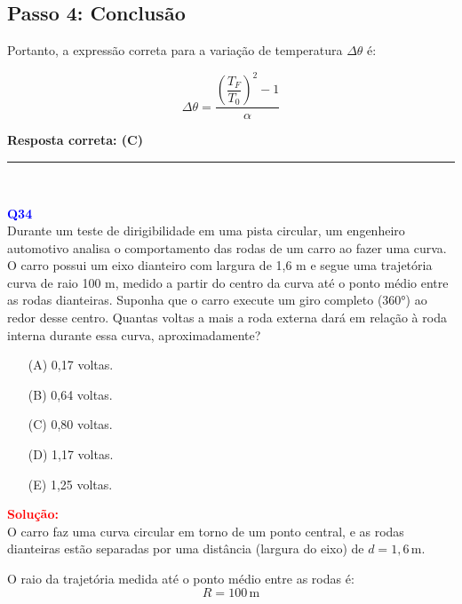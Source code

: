 \documentclass[a4paper,12pt]{article}
\begin{document}
\begin{flushleft}
\subsection*{Passo 4: Conclusão}

Portanto, a expressão correta para a variação de temperatura $\Delta \theta$ é:

\[
\boxed{
\Delta \theta = \frac{\left(\dfrac{T_F}{T_0}\right)^2 - 1}{\alpha}
}
\]

\bigskip


\textbf{Resposta correta: \colorbox{green!50}{(C)}}

\end{flushleft}
\noindent\rule{\linewidth}{0.6pt}\\

\begin{flushleft}
\textbf{\textcolor{blue}{\Large Q34}}\\

Durante um teste de dirigibilidade em uma pista circular, um engenheiro automotivo analisa o comportamento das 
rodas de um carro ao fazer uma curva. O carro possui um eixo dianteiro com largura de 1,6 m e segue uma trajetória 
curva de raio 100 m, medido a partir do centro da curva até o ponto médio entre as rodas dianteiras. Suponha que o 
carro execute um giro completo (360°) ao redor desse centro. Quantas voltas a mais a roda externa dará em relação à 
roda interna durante essa curva, aproximadamente?

\begin{itemize}
\item[(A)] 0,17 voltas.
\item[(B)] 0,64 voltas.
\item[(C)] 0,80 voltas.
\item[(D)] 1,17 voltas.
\item[(E)] 1,25 voltas.

\end{itemize}

\vspace{0.5cm}

\textcolor{red}{\textbf{Solução:}}\\

O carro faz uma curva circular em torno de um ponto central, e as rodas dianteiras estão separadas por uma distância (largura do eixo) de $d = 1,6\,\text{m}$.

O raio da trajetória medida até o ponto médio entre as rodas é:
\[
R = 100\,\text{m}
\]

\bigskip


\end{flushleft}
\end{document}
